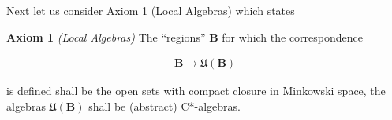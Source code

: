 Next let us consider Axiom 1 (Local Algebras) which states
 
\textbf{Axiom 1} \textit{(Local Algebras)} The ``regions'' $\mathbf{B}$ for which the correspondence

\begin{align}
    \mathbf{B} \rightarrow \mathfrak{U}(\mathbf{B})
\end{align}

is defined shall be the open sets with compact closure in Minkowski space, the algebras $\mathfrak{U}(\mathbf{B})$ shall be (abstract) C*-algebras.
